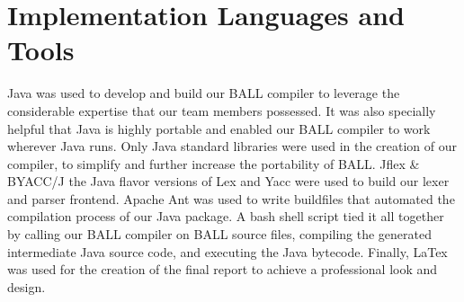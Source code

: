 \section{Implementation Languages and Tools}

Java was used to develop and build our BALL compiler to leverage the
considerable expertise that our team members possessed. It was also
specially helpful that Java is highly portable and enabled our BALL
compiler to work wherever Java runs. Only Java standard libraries were
used in the creation of our compiler, to simplify and further increase
the portability of BALL. Jflex \& BYACC/J the Java flavor versions of
Lex and Yacc were used to build our lexer and parser frontend. 
Apache Ant was used to write buildfiles that automated the compilation process 
of our Java package. A bash shell script tied it all together by calling our 
BALL compiler on BALL source files, compiling the generated intermediate Java
source code, and executing the Java bytecode. Finally, LaTex was used for the 
creation of the final report to achieve a professional look and design.
